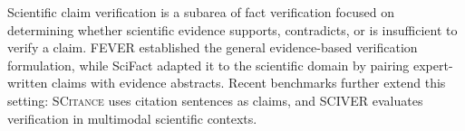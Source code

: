 \documentclass{article}
\theoremstyle{plain}
\theoremstyle{definition}
\theoremstyle{remark}
\begin{document}


Scientific claim verification is a subarea of fact verification focused on determining whether scientific evidence supports, contradicts, or is insufficient to verify a claim. FEVER \cite{thorne2018fever} established the general evidence-based verification formulation, while SciFact \cite{wadden2020fact,wadden2022scifact} adapted it to the scientific domain by pairing expert-written claims with evidence abstracts. Recent benchmarks further extend this setting: \textsc{SCitance} \cite{alvarez2024zero} uses citation sentences as claims, and SCIVER \cite{wang2025sciver} evaluates verification in multimodal scientific contexts.
\end{document}
